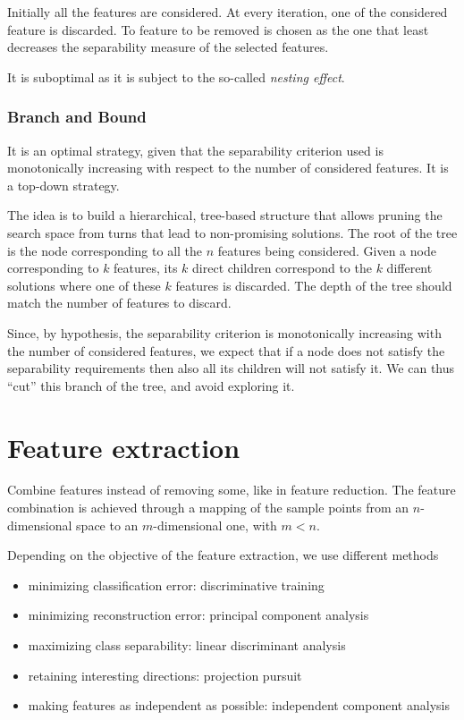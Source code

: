 \documentclass[oneside,onecolumn]{report}
\begin{document}
Initially all the features are considered.
At every iteration, one of the considered feature is discarded.
To feature to be removed is chosen as the one that least decreases the separability measure of the selected features.

It is suboptimal as it is subject to the so-called \emph{nesting effect}.

\subsubsection{Branch and Bound}
It is an optimal strategy, given that the separability criterion used is monotonically increasing with respect to the number of considered features.
It is a top-down strategy.

The idea is to build a hierarchical, tree-based structure that allows pruning the search space from turns that lead to non-promising solutions.
The root of the tree is the node corresponding to all the $n$ features being considered.
Given a node corresponding to $k$ features, its $k$ direct children correspond to the $k$ different solutions where one of these $k$ features is discarded.
The depth of the tree should match the number of features to discard.

Since, by hypothesis, the separability criterion is monotonically increasing with the number of considered features, we expect that if a node does not satisfy the separability requirements then also all its children will not satisfy it.
We can thus ``cut'' this branch of the tree, and avoid exploring it.


\section{Feature extraction}
Combine features instead of removing some, like in feature reduction.
The feature combination is achieved through a mapping of the sample points from an $n$-dimensional space to an $m$-dimensional one, with $m < n$.

Depending on the objective of the feature extraction, we use different methods
\begin{itemize}
    \item minimizing classification error: discriminative training
    \item minimizing reconstruction error: principal component analysis
    \item maximizing class separability: linear discriminant analysis
    \item retaining interesting directions: projection pursuit
    \item making features as independent as possible: independent component analysis
\end{itemize}
\end{document}
